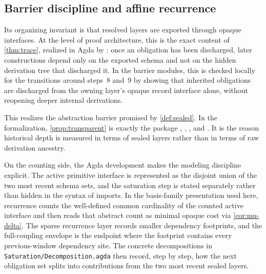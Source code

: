 \documentclass{lmcs}
\begin{document}
\subsection{Barrier discipline and affine recurrence}

Its organizing invariant is that resolved layers are exported through opaque interfaces. At the level of proof architecture, this is the exact content of \autoref{thm:trace}, realized in Agda by : once an obligation has been discharged, later constructions depend only on the exported schema and not on the hidden derivation tree that discharged it. In the barrier modules, this is checked locally for the transitions around steps~8 and~9 by showing that inherited obligations are discharged from the owning layer's opaque record interface alone, without reopening deeper internal derivations.

This realizes the abstraction barrier promised by \autoref{def:sealed}. In the formalization, \autoref{prop:transparent} is exactly the package , , , and . It is the reason historical depth is measured in terms of sealed layers rather than in terms of raw derivation ancestry.

On the counting side, the Agda development makes the modeling discipline explicit. The active primitive interface is represented as the disjoint union of the two most recent schema sets, and the saturation step is stated separately rather than hidden in the syntax of imports. In the basis-family presentation used here, recurrence counts the well-defined common cardinality of the counted active interface and then reads that abstract count as minimal opaque cost via \autoref{cor:mu-delta}. The sparse recurrence layer records smaller dependency footprints, and the full-coupling envelope is the endpoint where the footprint contains every previous-window dependency site. The concrete decompositions in \texttt{Saturation/Decomposition.agda} then record, step by step, how the next obligation set splits into contributions from the two most recent sealed layers.
\end{document}
